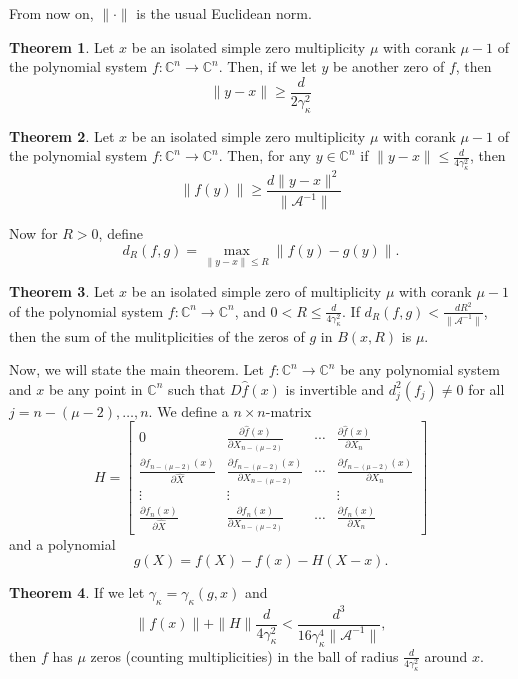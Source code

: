 \documentclass[12pt,oneside,reqno]{amsart}
\theoremstyle{definition}
\newtheorem{thm}{Theorem}
\newcommand{\CC}{\mathbb{C}}
\begin{document}
From now on, $\|\cdot \|$ is the usual Euclidean norm.




\begin{thm}\label{thm:tripleRootSeparationBound}
	Let $x$ be an isolated simple zero multiplicity $\mu$ with corank $\mu-1$ of the polynomial system $f:\mathbb{C}^n\rightarrow\mathbb{C}^n$. Then, if we let $y$ be another zero of $f$, then
	\[\|y-x\|\geq \frac{d}{2\gamma_\kappa^2}\]
\end{thm}

\begin{thm}\label{thm:lowerboundfy}
	Let $x$ be an isolated simple zero multiplicity $\mu$ with corank $\mu-1$ of the polynomial system $f:\mathbb{C}^n\rightarrow \mathbb{C}^n$. Then, for any $y\in \CC^n$ if $\|y-x\|\leq \frac{d}{4\gamma_\kappa^2}$, then
	\[\left\|f(y)\right\|\geq \frac{d\|y-x\|^2}{\|\mathcal{A}^{-1}\|}\]
\end{thm}


Now for $R>0$, define
\begin{equation*}
d_R(f,g)=\max\limits_{\|y-x\|\leq R}\|f(y)-g(y)\|.
\end{equation*}
\begin{thm}\label{thm:multiplicityOfDiffSystem}
	Let $x$ be an isolated simple zero of multiplicity $\mu$ with corank $\mu-1$ of the polynomial system $f:\mathbb{C}^n\rightarrow\mathbb{C}^n$, and $0<R\leq \frac{d}{4\gamma_\kappa^2}$. If $d_R(f,g)<\frac{dR^2}{\|\mathcal{A}^{-1}\|}$, then the sum of the mulitplicities of the zeros of $g$ in $B(x,R)$ is $\mu$.
\end{thm}

Now, we will state the main theorem. Let $f:\mathbb{C}^n\rightarrow\mathbb{C}^n$ be any polynomial system and $x$ be any point in $\CC^n$ such that $D\hat{f}(x)$ is invertible and $d_j^2(f_j)\ne 0$ for all $j=n-(\mu-2),\dots,n$. We define a $n\times n$-matrix 
\[H=\begin{bmatrix}
0 & \frac{\partial\hat{f}(x)}{\partial X_{n-(\mu-2)}} & \cdots & \frac{\partial\hat{f}(x)}{\partial X_{n}}\\
\frac{\partial f_{n-(\mu-2)}(x)}{\partial\hat{X}} & \frac{\partial f_{n-(\mu-2)}(x)}{\partial X_{n-(\mu-2)}} & \cdots & \frac{\partial f_{n-(\mu-2)}(x)}{\partial X_{n}}\\
\vdots & \vdots & & \vdots \\
\frac{\partial f_{n}(x)}{\partial\hat{X}} & \frac{\partial f_{n}(x)}{\partial X_{n-(\mu-2)}} & \cdots & \frac{\partial f_{n}(x)}{\partial X_{n}}
\end{bmatrix}\]
and a polynomial
\[g(X)= f(X)-f(x)-H(X-x).\]
\begin{thm}\label{thm:clusterthm}
	If we let $\gamma_\kappa=\gamma_\kappa(g,x)$ and \[\|f(x)\|+\|H\|\frac{d}{4\gamma_\kappa^2}<\frac{d^3}{16\gamma_\kappa^4\|\mathcal{A}^{-1}\|},\]
	then $f$ has $\mu$ zeros (counting multiplicities) in the ball of radius $\frac{d}{4\gamma_\kappa^2}$ around $x$.
\end{thm}
\end{document}

